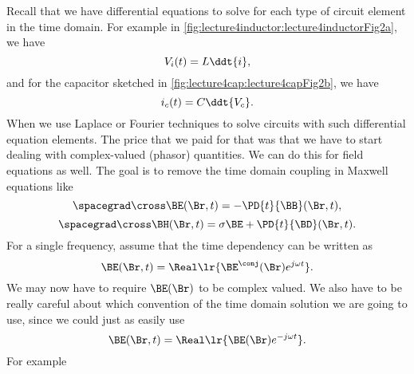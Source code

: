 %
%
%
Recall that we have differential equations to solve for each type of circuit element in the time domain.  For example in \cref{fig:lecture4inductor:lecture4inductorFig2a}, we have
%
\begin{dmath}\label{eqn:emtLecture5:980}
V_i(t) = L \ddt{i},
\end{dmath}
%
%
and for the capacitor sketched in \cref{fig:lecture4cap:lecture4capFig2b}, we have
\begin{dmath}\label{eqn:emtLecture5:1000}
i_c(t) = C \ddt{V_c}.
\end{dmath}
%
%
When we use Laplace or Fourier techniques to solve circuits with such differential equation elements.  The price that we paid for that was that we have to start dealing with complex-valued (phasor) quantities.  We can do this for field equations as well.  The goal is to remove the time domain coupling in Maxwell equations like
%
\begin{dmath}\label{eqn:emtLecture5:460}
\spacegrad \cross \BE(\Br, t) = -\PD{t}{\BB}(\Br, t),
\end{dmath}
\begin{dmath}\label{eqn:emtLecture5:480}
\spacegrad \cross \BH(\Br, t) = \sigma \BE + \PD{t}{\BD}(\Br, t).
\end{dmath}
%
For a single frequency, assume that the time dependency can be written as
%
\begin{dmath}\label{eqn:emtLecture5:500}
\BE(\Br, t) = \Real \lr{ \BE^\conj(\Br) e^{j \omega t} }.
\end{dmath}
%
We may now have to require \( \BE(\Br) \) to be complex valued.
We also have to be really careful about which convention of the time domain solution we are going to use, since we could just as easily use
%
\begin{dmath}\label{eqn:emtLecture5:720}
\BE(\Br, t) = \Real \lr{ \BE(\Br) e^{-j \omega t} }.
\end{dmath}
%
For example
